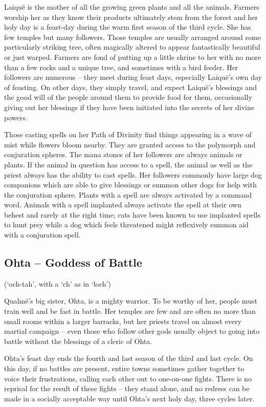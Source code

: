 \documentclass[titlepage,a4paper,openany]{book}
\begin{document}
\begin{multicols}{2}
\noindent Laiqu\"{e} is the mother of all the growing green plants and all the animals. Farmers worship her as they know their products ultimately stem from the forest and her holy day is a feast-day during the warm first season of the third cycle. She has few temples but many followers. Those temples are usually arranged around some particularly striking tree, often magically altered to appear fantastically beautiful or just warped. Farmers are fond of putting up a little shrine to her with no more than a few rocks and a unique tree, and sometimes with a bird feeder. Her followers are numerous -- they meet during feast days, especially Laiqu\"{e}'s own day of feasting. On other days, they simply travel, and expect Laiqu\"{e}'s blessings and the good will of the people around them to provide food for them, occasionally giving out her blessings if they have been initiated into the secrets of her divine powers.

Those casting spells on her Path of Divinity find things appearing in a wave of mist while flowers bloom nearby. They are granted access to the polymorph and conjuration spheres. The mana stones of her followers are always animals or plants. If the animal in question has access to a spell, the animal as well as the priest always has the ability to cast spells. Her followers commonly have large dog companions which are able to give blessings or summon other dogs for help with the conjuration sphere. Plants with a spell are always activated by a command word. Animals with a spell implanted always activate the spell at their own behest and rarely at the right time; cats have been known to use implanted spells to hunt prey while a dog which feels threatened might reflexively summon aid with a conjuration spell.

\subsection{Ohta -- Goddess of Battle}
(`och-tah', with a `ch' as in `loch')

\noindent Qualm\"{e}'s big sister, Ohta, is a mighty warrior. To be worthy of her, people must train well and be fast in battle. Her temples are few and are often no more than small rooms within a larger barracks, but her priests travel on almost every martial campaign -- even those who follow other gods usually object to going into battle without the blessings of a cleric of Ohta.

Ohta's feast day ends the fourth and last season of the third and last cycle. On this day, if no battles are present, entire towns sometimes gather together to voice their frustrations, calling each other out to one-on-one fights. There is no reprisal for the result of these fights -- they stand alone, and no redress can be made in a socially acceptable way until Ohta's next holy day, three cycles later.


\end{multicols}
\end{document}
